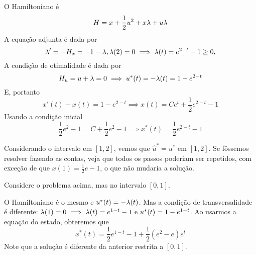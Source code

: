\Space

O Hamiltoniano é 
$$
H = x + \frac{1}{2}u^2 + x \lambda + u \lambda
$$
A equação adjunta é dada por 
$$
\lambda ' = - H_x = -1 - \lambda, \lambda(2) = 0 \implies \lambda(t) = e^{2-t} -1 \ge 0,
$$
A condição de otimalidade é dada por 
$$
H_u = u + \lambda = 0 \implies u^*(t) = -\lambda(t) = 1 - e^{2-t} 
$$
E, portanto 
$$
x'(t) - x(t) = 1 - e^{2-t} \implies x(t) = Ce^t + \frac{1}{2}e^{2-t} - 1
$$
Usando a condição inicial 
$$
\frac{1}{2}e^2 - 1 = C + \frac{1}{2}e^{2} - 1 \implies x^*(t) =  \frac{1}{2}e^{2-t} - 1   
$$

Considerando o intervalo em $[1,2]$, vemos que $\hat{u}^* = u^*$ em $[1,2]$. Se fôssemos resolver 
fazendo as contas, veja que todos os passos poderiam ser repetidos, com exceção de que $x(1) = \frac{1}{2}e - 1$, 
o que não mudaria a solução. 

\begin{example}
    Considere o problema acima, mas no intervalo $[0,1]$. 
\end{example}

O Hamiltoniano é o mesmo e $u^*(t) = -\lambda(t)$. Mas a condição de transversalidade é diferente: 
$\lambda(1) = 0 \implies \lambda(t) = e^{1-t} - 1 \text{ e } u^{*}(t) = 1 - e^{1-t}$. 
Ao usarmos a equação do estado, obteremos que 
$$
x^*(t) = \frac{1}{2}e^{1-t} - 1 + \frac{1}{2}(e^2 - e)e^t
$$
Note que a solução é diferente da anterior restrita a $[0,1]$. 